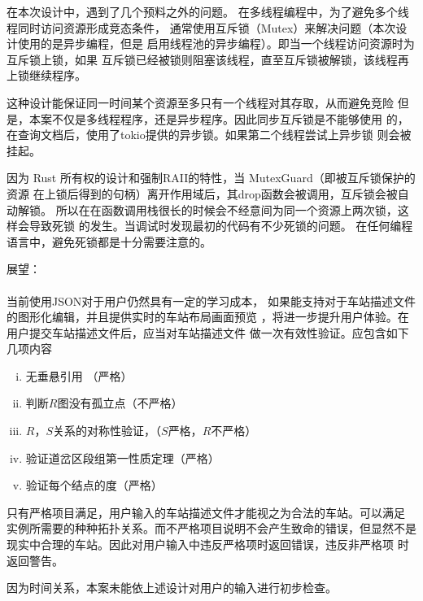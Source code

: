 \begin{keturon}
    在本次设计中，遇到了几个预料之外的问题。
    在多线程编程中，为了避免多个线程同时访问资源形成竞态条件，
    通常使用互斥锁（Mutex）来解决问题（本次设计使用的是异步编程，但是
    启用线程池的异步编程）。即当一个线程访问资源时为互斥锁上锁，如果
    互斥锁已经被锁则阻塞该线程，直至互斥锁被解锁，该线程再上锁继续程序。

    这种设计能保证同一时间某个资源至多只有一个线程对其存取，从而避免竞险
    但是，本案不仅是多线程程序，还是异步程序。因此同步互斥锁是不能够使用
    的，在查询文档后，使用了tokio提供的异步锁。如果第二个线程尝试上异步锁
    则会被挂起。

    因为 Rust 所有权的设计和强制RAII的特性，当 MutexGuard（即被互斥锁保护的资源
    在上锁后得到的句柄）离开作用域后，其drop函数会被调用，互斥锁会被自动解锁。
    所以在在函数调用栈很长的时候会不经意间为同一个资源上两次锁，这样会导致死锁
    的发生。当调试时发现最初的代码有不少死锁的问题。
    在任何编程语言中，避免死锁都是十分需要注意的。

    展望：

    \paragraph{} 当前使用JSON对于用户仍然具有一定的学习成本，
    如果能支持对于车站描述文件的图形化编辑，并且提供实时的车站布局画面预览
    ，将进一步提升用户体验。在用户提交车站描述文件后，应当对车站描述文件
    做一次有效性验证。应包含如下几项内容
    \begin{enumerate}[i.]
        \item 无垂悬引用 （严格）
        \item 判断$R$图没有孤立点（不严格）
        \item $R$，$S$关系的对称性验证，（$S$严格，$R$不严格）
        \item 验证道岔区段组第一性质定理（严格）
        \item 验证每个结点的度（严格）
    \end{enumerate}
    只有严格项目满足，用户输入的车站描述文件才能视之为合法的车站。可以满足
    实例所需要的种种拓扑关系。而不严格项目说明不会产生致命的错误，但显然不是
    现实中合理的车站。因此对用户输入中违反严格项时返回错误，违反非严格项
    时返回警告。

    因为时间关系，本案未能依上述设计对用户的输入进行初步检查。



\end{keturon}
